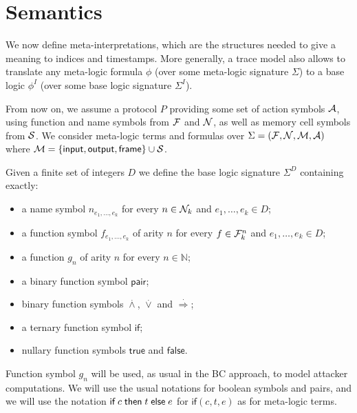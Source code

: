 \section{Semantics}

We now define meta-interpretations, which are the structures needed to
give a meaning to indices and timestamps. More generally, a trace model
also allows to translate any meta-logic formula $\phi$
(over some meta-logic signature $\Sigma$)
to a base logic $\phi^I$ (over some base logic signature $\Sigma^I$).


\medskip

From now on, we assume a protocol $P$ providing some set of action
symbols $\mathcal{A}$, using function and name symbols from $\mathcal{F}$ and $\mathcal{N}$,
as well as memory cell symbols from $\mathcal{S}$.
We consider meta-logic terms and formulas over $\Sigma = (\mathcal{F},\mathcal{N},\mathcal{M},\mathcal{A})$
where $\mathcal{M} = \{ \textsf{input}, \textsf{output}, \textsf{frame} \} \cup \mathcal{S}$.

\begin{definition}
  Given a finite set of integers $D$ we define the base logic
  signature $\Sigma^D$ containing exactly:
  \begin{itemize}
    \item a name symbol $n_{e_1,\ldots,e_k}$ for every $n \in \mathcal{N}_k$
       and $e_1,\ldots,e_k \in D$;
    \item a function symbol $f_{e_1,\ldots,e_k}$ of arity $n$ for every
      $f \in \mathcal{F}_k^n$ and $e_1,\ldots,e_k \in D$;
    \item a function $g_n$ of arity $n$ for every $n\in\mathbb{N}$;
    \item a binary function symbol $\mathsf{pair}$;
    \item binary function symbols
      $\stackrel{.}{\wedge}$, $\stackrel{.}{\vee}$ and
      $\stackrel{.}{\Rightarrow}$;
    \item a ternary function symbol $\mathsf{if}$;
    \item nullary function symbols $\mathsf{true}$ and $\mathsf{false}$.
  \end{itemize}
  Function symbol $g_n$ will be used, as usual in the BC 
  approach, to model attacker computations.
  We will use the usual notations for boolean symbols and pairs,
  and we will use the notation $\textsf{if}\; c \;\textsf{then}\; t \;\textsf{else}\; e$
  for $\mathsf{if}(c,t,e)$ as for meta-logic terms.
\end{definition}

